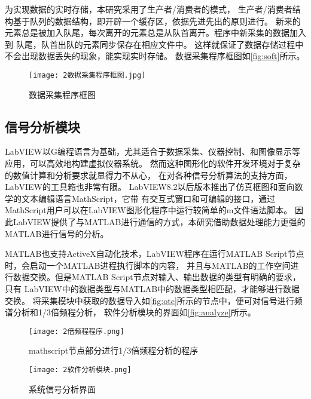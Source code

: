 为实现数据的实时存储，本研究采用了生产者/消费者的模式，
生产者/消费者结构基于队列的数据结构，即开辟一个缓存区，依据先进先出的原则进行。
新来的元素总是被加入队尾，每次离开的元素总是从队首离开。程序中新采集的数据加入到
队尾，队首出队的元素同步保存在相应文件中。
这样就保证了数据存储过程中不会出现数据丢失的现象，能实现实时存储。
数据采集程序框图如\autoref{fig:soft}所示。
\begin{figure}[htbp]
    \centering
    \texttt{[image: 2数据采集程序框图.jpg]}
    \caption{\label{fig:soft}数据采集程序框图}
\end{figure}


\subsection{信号分析模块}
LabVIEW以G编程语言为基础，尤其适合于数据采集、仪器控制、和图像显示等应用，可以高效地构建虚拟仪器系统。
然而这种图形化的软件开发环境对于复杂的数值计算和分析要求就显得力不从心，
在对各种信号分析算法的支持方面，LabVIEW的工具箱也非常有限。
LabVIEW8.2以后版本推出了仿真框图和面向数学的文本编辑语言MathScript，它带
有交互式窗口和可编辑的接口，通过MathScript用户可以在LabVIEW图形化程序中运行较简单的m文件语法脚本。
因此LabVIEW提供了与MATLAB进行通信的方式，本研究借助数据处理能力更强的MATLAB进行信号的分析。

MATLAB也支持ActiveX自动化技术，LabVIEW程序在运行MATLAB Script节点时，会启动一个MATLAB进程执行脚本的内容，
并且与MATLAB的工作空间进行数据交换。但是MATLAB Script节点对输入、输出数据的类型有明确的要求，只有
LabVIEW中的数据类型与MATLAB中的数据类型相匹配，才能够进行数据交换。
将采集模块中获取的数据导入如\autoref{fig:otc}所示的节点中，便可对信号进行频谱分析和1/3倍频程分析，
软件分析模块的界面如\autoref{fig:analyze}所示。
\begin{figure}[htbp]
    \centering
    \texttt{[image: 2倍频程程序.png]}
    \caption{\label{fig:otc}mathscript节点部分进行1/3倍频程分析的程序}
\end{figure}

\begin{figure}[htbp]
    \centering
    \texttt{[image: 2软件分析模块.png]}
    \caption{\label{fig:analyze}系统信号分析界面}
\end{figure}

